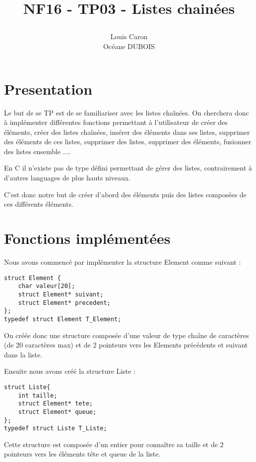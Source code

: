 \documentclass[11pt]{report}
\title{\textbf{NF16 - TP03 - Listes chainées}
\author{Louis Caron \\ Océane DUBOIS\\}
\date{}}
\begin{document}
\maketitle

\newpage

\section{Presentation}

Le but de se TP est de se familiariser avec les listes chaînées. On cherchera donc à implémenter différentes fonctions permettant à l'utilisateur de créer des éléments, créer des listes chaînées, insérer des éléments dans ses listes, supprimer des éléments de ces listes, supprimer des listes, supprimer des éléments, fusionner des listes ensemble ....

En C il n'existe pas de type défini permettant de gérer des listes, contrairement à d'autres languages de plus hauts niveaux.

C'est donc notre but de créer d'abord des éléments puis des listes composées de ces différents éléments.

\section{Fonctions implémentées}

Nous avons commencé par implémenter la structure Element comme suivant :

\begin{lstlisting}
struct Element {
	char valeur[20];
	struct Element* suivant;
	struct Element* precedent;
};
typedef struct Element T_Element;
\end{lstlisting}
On créée donc une structure composée d'une valeur de type chaîne de caractères (de 20 caractères max) et de 2 pointeurs vers les Elements précédents et suivant dans la liste.

Ensuite nous avons créé la structure Liste :

\begin{lstlisting}
struct Liste{
	int taille;
	struct Element* tete;
	struct Element* queue;
};
typedef struct Liste T_Liste;

\end{lstlisting}

Cette structure est composée d'un entier pour connaître sa taille et de 2 pointeurs vers les éléments tête et queue de la liste.
\end{document}
